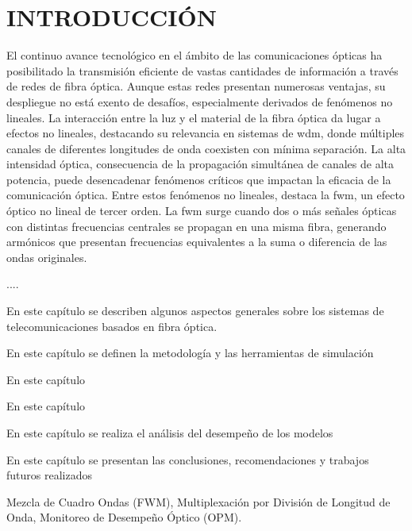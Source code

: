 \setcounter{page}{1}

\chapter*{INTRODUCCIÓN}
\label{chap0:introducion}
\justify %

\hspace*{1em} El continuo avance tecnológico en el ámbito de las comunicaciones ópticas ha posibilitado la transmisión eficiente de vastas cantidades de información a través de redes de fibra óptica. Aunque estas redes presentan numerosas ventajas, su despliegue no está exento de desafíos, especialmente derivados de fenómenos no lineales. La interacción entre la luz y el material de la fibra óptica da lugar a efectos no lineales, destacando su relevancia en sistemas de \acrfull{wdm}, donde múltiples canales de diferentes longitudes de onda coexisten con mínima separación. La alta intensidad óptica, consecuencia de la propagación simultánea de canales de alta potencia, puede desencadenar fenómenos críticos que impactan la eficacia de la comunicación óptica. Entre estos fenómenos no lineales, destaca la \acrfull{fwm}, un efecto óptico no lineal de tercer orden. La \acrshort{fwm} surge cuando dos o más señales ópticas con distintas frecuencias centrales se propagan en una misma fibra, generando armónicos que presentan frecuencias equivalentes a la suma o diferencia de las ondas originales.

....



En este capítulo se describen algunos aspectos generales sobre los sistemas de telecomunicaciones basados en fibra óptica. 
\vfill


En este capítulo se definen la metodología y las herramientas de simulación 
\vfill


En este capítulo
\vfill


En este capítulo %
\vfill


En este capítulo se realiza el análisis del desempeño de los modelos 
\vfill


En este capítulo se presentan las conclusiones, recomendaciones y trabajos futuros realizados 
\vfill



Mezcla de Cuadro Ondas (FWM), Multiplexación por División de Longitud de Onda, Monitoreo de Desempeño Óptico (OPM).
